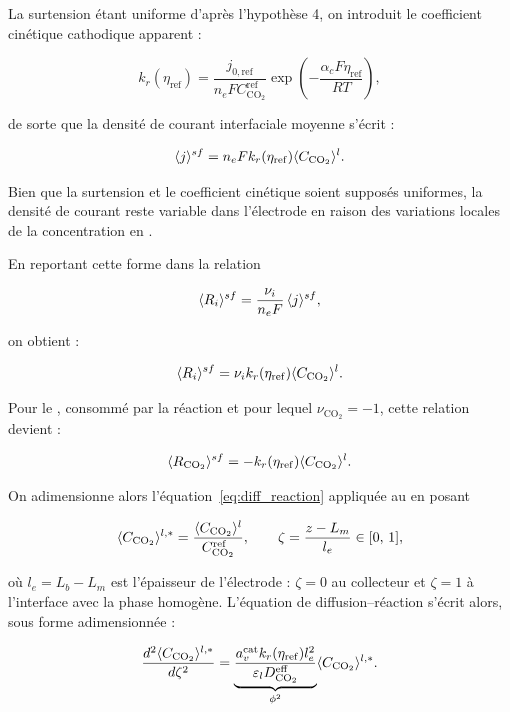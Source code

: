 La surtension étant uniforme d'après l'hypothèse 4, on introduit
le coefficient cinétique cathodique apparent :

\begin{equation}
k_r(\eta_{\mathrm{ref}})
=
\frac{j_{0,\mathrm{ref}}}
     {n_e F C_{\mathrm{CO_2}}^{\mathrm{ref}}}
\exp\!\left(
-\frac{\alpha_c F\eta_{\mathrm{ref}}}{RT}
\right),
\end{equation}

de sorte que la densité de courant interfaciale moyenne s'écrit :

\begin{equation}
\langle j \rangle^{sf}
=
n_e F
k_r(\eta_{\mathrm{ref}})
\langle C_{\mathrm{CO_2}} \rangle^l.
\end{equation}

Bien que la
surtension et le coefficient cinétique soient supposés uniformes,
la densité de courant reste variable dans l'électrode en raison des
variations locales de la concentration en .

En reportant cette forme dans la relation

\begin{equation}
\langle R_i \rangle^{sf} = \frac{\nu_i}{n_eF}\,\langle j \rangle^{sf} ,
\end{equation}

on obtient :

\begin{equation}
\langle R_i \rangle^{sf}
=
\nu_i
k_r(\eta_{\mathrm{ref}})
\langle C_{\mathrm{CO_2}} \rangle^l.
\end{equation}

Pour le , consommé par la réaction et pour lequel
$\nu_{\mathrm{CO_2}}=-1$, cette relation devient :

\begin{equation}
\langle R_{\mathrm{CO_2}} \rangle^{sf}
=
-
k_r(\eta_{\mathrm{ref}})
\langle C_{\mathrm{CO_2}} \rangle^l.
\end{equation}

On adimensionne alors l'équation~\eqref{eq:diff_reaction} appliquée au
 en posant

\[
\langle C_{\mathrm{CO_2}} \rangle^{l,*}
=
\frac{\langle C_{\mathrm{CO_2}} \rangle^l}
     {C_{\mathrm{CO_2}}^{\mathrm{ref}}},
\qquad
\zeta = \frac{z - L_m}{l_e} \in [0,\,1],
\]

où $l_e = L_b - L_m$ est l'épaisseur de l'électrode : $\zeta = 0$ au
collecteur et $\zeta = 1$ à l'interface avec la phase homogène. L'équation de
diffusion--réaction s'écrit alors, sous forme adimensionnée :

\begin{equation}
\frac{d^2 \langle C_{\mathrm{CO_2}} \rangle^{l,*}}
     {d \zeta^2}
=
\underbrace{
\frac{
a_v^{\mathrm{cat}}
k_r(\eta_{\mathrm{ref}})
l_e^2
}{
\varepsilon_l
D_{\mathrm{CO_2}}^{\mathrm{eff}}
}
}_{\phi^2}
\langle C_{\mathrm{CO_2}} \rangle^{l,*}.
\label{eq:diff_react_1D}
\end{equation}

